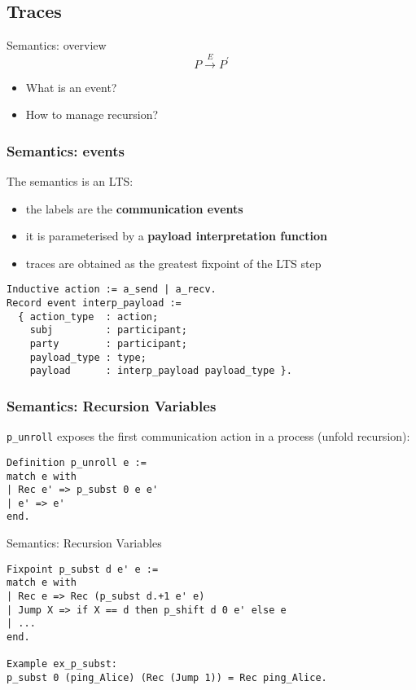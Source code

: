 \subsection{Traces}

\begin{frame}{Semantics: overview}
	\[P\xrightarrow{E} P^\prime\]
	\vspace{1cm}
	\begin{itemize}
		\item What is an event?
		\item How to manage recursion?
	\end{itemize}
\end{frame}

\begin{frame}[fragile]
    \frametitle{Semantics: events}
    The semantics is an LTS: 
    \begin{itemize}
    \item the labels are the \textbf{communication events}
    \item it is parameterised by a \textbf{payload interpretation function}
    \item traces are obtained as the greatest fixpoint of the LTS step
    \end{itemize}
\vspace{.5cm}
    \begin{verbatim}
Inductive action := a_send | a_recv.
Record event interp_payload :=
  { action_type  : action;
    subj         : participant;
    party        : participant;
    payload_type : type;
    payload      : interp_payload payload_type }.
    \end{verbatim}
\end{frame}

\begin{frame}[fragile]
    \frametitle{Semantics: Recursion Variables}
\verb|p_unroll| exposes the first communication action in a process (unfold recursion):
\vspace{1cm}
    \begin{verbatim}
Definition p_unroll e := 
match e with
| Rec e' => p_subst 0 e e'
| e' => e'
end.
    \end{verbatim}
\end{frame}

\begin{frame}[fragile]{Semantics: Recursion Variables}
	\begin{verbatim}
Fixpoint p_subst d e' e :=
match e with
| Rec e => Rec (p_subst d.+1 e' e)
| Jump X => if X == d then p_shift d 0 e' else e
| ...
end.

Example ex_p_subst:
p_subst 0 (ping_Alice) (Rec (Jump 1)) = Rec ping_Alice.
	\end{verbatim}
\end{frame}


